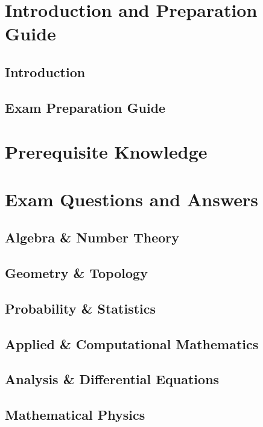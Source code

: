 \part{Introduction and Preparation Guide}

\chapter{Introduction}
\label{ch:introduction}
\margintoc


\chapter{Exam Preparation Guide}
\label{ch:preparation}
\margintoc


\part{Prerequisite Knowledge}


\part{Exam Questions and Answers}
\chapter{Algebra \& Number Theory}
\label{ch:algebra}
\margintoc


\chapter{Geometry \& Topology}
\label{ch:geometry}
\margintoc


\chapter{Probability \& Statistics}
\label{ch:probability}
\margintoc


\chapter{Applied \& Computational Mathematics}
\label{ch:applied}
\margintoc


\chapter{Analysis \& Differential Equations}
\label{ch:analysis}
\margintoc


\chapter{Mathematical Physics}
\label{ch:physics}
\margintoc

